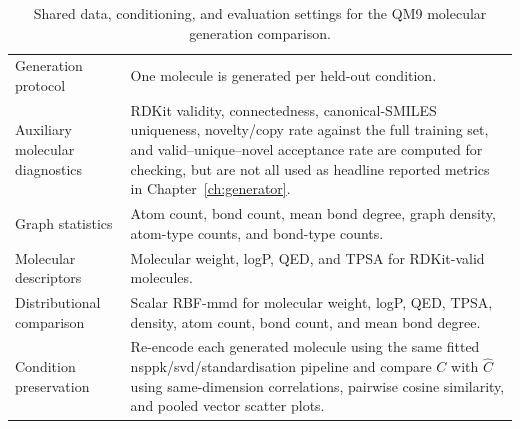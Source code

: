 \begin{table}[p]
\begin{tabularx}{\textwidth}{@{}p{}X@{}}
Generation protocol & One molecule is generated per held-out condition. \\
Auxiliary molecular diagnostics & RDKit validity, connectedness, canonical-SMILES uniqueness, novelty/copy rate against the full training set, and valid--unique--novel acceptance rate are computed for checking, but are not all used as headline reported metrics in Chapter~\ref{ch:generator}. \\
Graph statistics & Atom count, bond count, mean bond degree, graph density, atom-type counts, and bond-type counts. \\
Molecular descriptors & Molecular weight, logP, QED, and TPSA for RDKit-valid molecules. \\
Distributional comparison & Scalar RBF-\gls{mmd} for molecular weight, logP, QED, TPSA, density, atom count, bond count, and mean bond degree. \\
Condition preservation & Re-encode each generated molecule using the same fitted \gls{nsppk}/\gls{svd}/standardisation pipeline and compare \(C\) with \(\hat C\) using same-dimension correlations, pairwise cosine similarity, and pooled vector scatter plots. \\
\bottomrule
\end{tabularx}
\caption{Shared data, conditioning, and evaluation settings for the QM9 molecular generation comparison.}
\label{tab:qm9-shared-molecular-settings}
\end{table}

